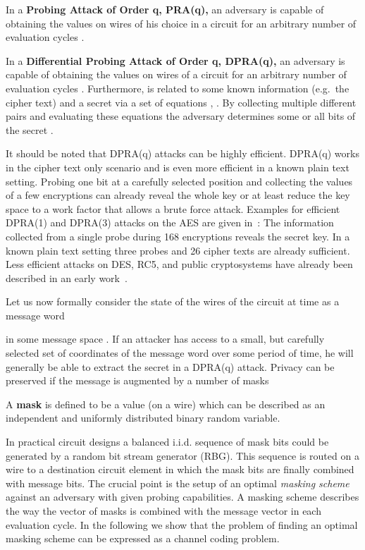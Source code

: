 \documentclass[11pt]{llncs}
\newcommand{\BDEF}{\begin{definition}}  \newcommand{\EDEF}{\end{definition}}
\newcommand{\eg}{{e.g.\ }}
\begin{document}
\BDEF
In a \textbf{Probing Attack of Order q, PRA(q),} an adversary
is capable of obtaining the values 
on  wires of his choice in a circuit for an arbitrary number of
evaluation cycles .
\label{Def:PRA}
\EDEF

\BDEF
In a \textbf{Differential Probing Attack of Order q, DPRA(q),}
an adversary is capable of obtaining the values
 on  wires of a circuit for
an arbitrary number of evaluation cycles .
Furthermore,  is related to some known information
(\eg the cipher text) and a secret 
via a set of  equations
, .
By collecting multiple different pairs
 and evaluating these equations
the adversary determines some or all bits of the secret .
\label{Def:DPRA}
\EDEF

It should be noted that DPRA(q) attacks can be highly efficient.
DPRA(q) works in the cipher text only scenario
and is even more efficient in a known plain text setting.
Probing one bit at a carefully selected position
and collecting the values of a few encryptions can already reveal
the whole key or at least reduce the key space to a
work factor that allows a brute force attack.
Examples for efficient DPRA(1) and DPRA(3) attacks on the AES
are given in~\cite{Schmidt2009ProbingAttackAES}:
The information collected from a single probe during 168 encryptions
reveals the secret key.
In a known plain text setting three probes and 26 cipher texts are already sufficient.
Less efficient attacks on DES, RC5, and public cryptosystems have already been described
in an early work~\cite{Handschuh1999ProbingAttackson}.

Let us now formally consider the state of the  wires of the circuit
at time  as a message word

in some message space .
If an attacker has access to a small, but carefully selected set of 
coordinates of the message word over some period of time,
he will generally be able to extract the secret in a DPRA(q) attack.
Privacy can be preserved if the message is augmented by a
number of  masks

\BDEF\label{Def:Mask}
A \textbf{mask}  is defined to be a value (on a wire) which can be described as
an independent and uniformly distributed binary random variable.
\EDEF
In practical circuit designs a balanced i.i.d. sequence of mask bits
could be generated by a random bit stream generator (RBG).
This sequence is routed on a wire to a
destination circuit element in which the mask bits
are finally
combined with message bits.
The crucial point is the setup of an optimal \emph{masking scheme}
against an adversary with given probing capabilities.
A masking scheme describes the way the vector of masks 
is combined with the message vector  in each evaluation cycle.
In the following we show that the problem of finding an optimal masking scheme
can be expressed as a channel coding problem.
\end{document}
